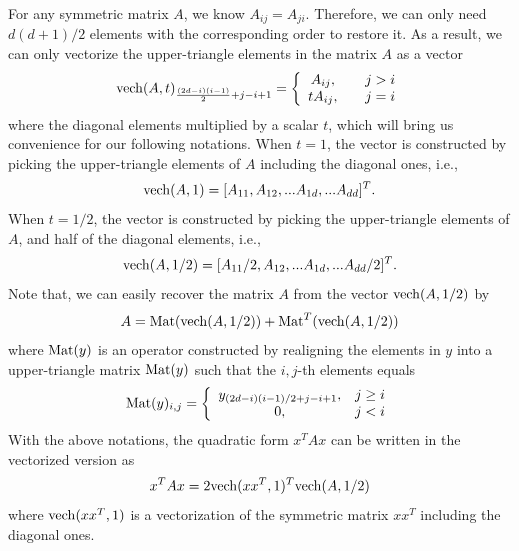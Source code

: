 \documentclass[aos,preprint]{imsart}
\theoremstyle{remark}
\begin{document}
For any symmetric matrix $A$, we know $A_{ij} = A_{ji}$. Therefore, we can only need ${d(d+1)}/{2}$ elements with the corresponding order to restore it. As a result, we can only vectorize the upper-triangle elements in the matrix $A$ as a vector 
\[
{\rm vech}(A,t)_{\frac{(2d-i)(i-1)}{2}+j-i+1} = \left\{
\begin{array}{cc}
A_{ij},    &\quad j>i\\
tA_{ij},&\quad j=i
\end{array}
\right.
\]
where the diagonal elements multiplied by a scalar $t$, which will bring us convenience for our following notations. When $t=1$, the vector is constructed by picking the upper-triangle elements of $A$ including the diagonal ones, i.e., 
\[
{\rm vech}(A,1) = [A_{11},A_{12},...A_{1d},...A_{dd}]^T.
\]
When $t=1/2$, the vector is constructed by picking the upper-triangle elements of $A$, and half of the diagonal elements, i.e.,
\[
{\rm vech}(A,{1}/{2}) = [A_{11}/2,A_{12},...A_{1d},...A_{dd}/2]^T.
\]
Note that, we can easily recover the matrix $A$ from the vector ${\rm vech}(A,1/2)$ by
\[
A = {\rm Mat} ({\rm vech}(A,1/2)) + {\rm Mat}^T ({\rm vech}(A,1/2)) 
\]
where ${\rm Mat}(y)$ is an operator constructed by realigning the elements in $y$ into a upper-triangle matrix ${\rm Mat} (y)$ such that the $i,j$-th elements equals
\[
{\rm Mat} (y) _{i,j} =\left\{
\begin{array}{cc}
 y_{{(2d-i)(i-1)}/{2}+j-i+1},& j\geq i\\
 0,& j<i
\end{array}
 \right.
\]
With the above notations, the quadratic form $x^T A x$ can be written in the vectorized version as
\[
x^T A x = 2{\rm vech}(xx^T,1)^T {\rm vech}(A,1/2)
\]
where ${\rm vech}(xx^T,1)$ is a vectorization of the symmetric matrix $xx^T$ including the diagonal ones.
\end{document}
